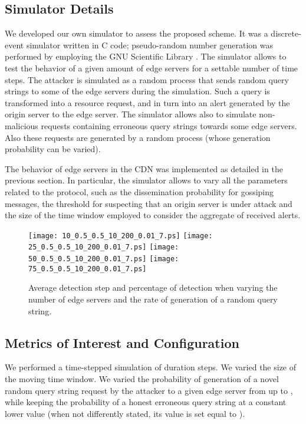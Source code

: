 \documentclass{IEEEtran}
\begin{document}
\subsection{Simulator Details}

We developed our own simulator to assess the proposed scheme. It was a discrete-event simulator written in C code; pseudo-random number generation was performed by employing the GNU Scientific Library \cite{gsl-web-2010}. The simulator allows to test the behavior of a given amount of edge servers for a settable number of time steps.
The attacker is simulated as a random process that sends random query strings to some of the edge servers during the simulation. Such a query is transformed into a resource request, and in turn into an alert generated by the origin server to the edge server. The simulator allows also to simulate non-malicious requests containing erroneous query strings towards some edge servers. Also these requests are generated by a random process (whose generation probability can be varied).

The behavior of edge servers in the CDN was implemented as detailed in the previous section. In particular, the simulator allows to vary all the parameters related to the protocol, such as the dissemination probability  for gossiping messages, the threshold for suspecting that an origin server is under attack and the size of the time window employed to consider the aggregate of received alerts.

\begin{figure*}[t]
   \centering
   \texttt{[image: 10\_0.5\_0.5\_10\_200\_0.01\_7.ps]}
   \texttt{[image: 25\_0.5\_0.5\_10\_200\_0.01\_7.ps]}
   \texttt{[image: 50\_0.5\_0.5\_10\_200\_0.01\_7.ps]}
   \texttt{[image: 75\_0.5\_0.5\_10\_200\_0.01\_7.ps]}
   \caption{Average detection step and percentage of detection when varying the number of edge servers and the rate of generation of a random query string.}
   \label{fig:varia_es}
 \vspace{-0.2cm}
\end{figure*}

\subsection{Metrics of Interest and Configuration}

We performed a time-stepped simulation of duration  steps. We varied the size of the moving time window.
We varied the probability of generation of a novel random query string request by the attacker to a given edge server  from  up to , while keeping the probability of a honest erroneous query string at a constant lower value (when not differently stated, its value is set equal to ).
\end{document}
